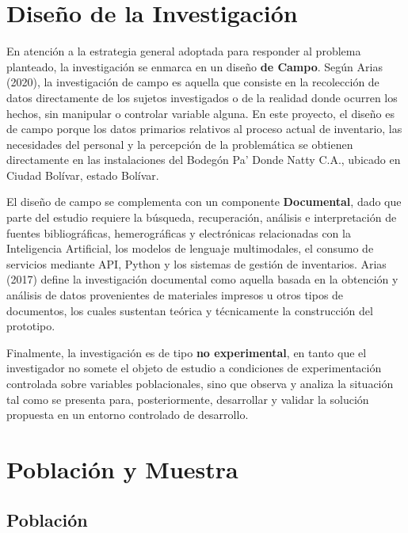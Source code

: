 \documentclass[12pt, letterpaper]{report}
\begin{document}
\section{Diseño de la Investigación}

En atención a la estrategia general adoptada para responder al problema
planteado, la investigación se enmarca en un diseño \textbf{de Campo}.
Según Arias (2020), la investigación de campo es aquella que consiste en
la recolección de datos directamente de los sujetos investigados o de la
realidad donde ocurren los hechos, sin manipular o controlar variable
alguna. En este proyecto, el diseño es de campo porque los datos
primarios relativos al proceso actual de inventario, las necesidades del
personal y la percepción de la problemática se obtienen directamente en
las instalaciones del Bodegón Pa' Donde Natty C.A., ubicado en Ciudad
Bolívar, estado Bolívar.

El diseño de campo se complementa con un componente \textbf{Documental},
dado que parte del estudio requiere la búsqueda, recuperación, análisis
e interpretación de fuentes bibliográficas, hemerográficas y
electrónicas relacionadas con la Inteligencia Artificial, los modelos
de lenguaje multimodales, el consumo de servicios mediante API, Python
y los sistemas de gestión de inventarios.
Arias (2017) define la investigación documental como aquella basada en
la obtención y análisis de datos provenientes de materiales impresos u
otros tipos de documentos, los cuales sustentan teórica y técnicamente
la construcción del prototipo.

Finalmente, la investigación es de tipo \textbf{no experimental}, en
tanto que el investigador no somete el objeto de estudio a condiciones
de experimentación controlada sobre variables poblacionales, sino que
observa y analiza la situación tal como se presenta para, posteriormente,
desarrollar y validar la solución propuesta en un entorno controlado de
desarrollo.

\section{Población y Muestra}

\subsection{Población}
\end{document}
